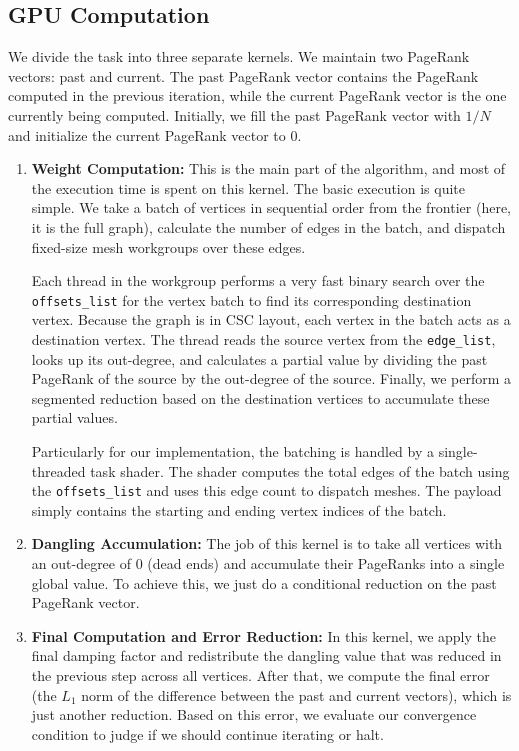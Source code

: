 \documentclass[11pt, a4paper]{article}
\begin{document}
\subsection{GPU Computation}
We divide the task into three separate kernels. We maintain two PageRank vectors: past and current. The past PageRank vector contains the PageRank computed in the previous iteration, while the current PageRank vector is the one currently being computed. Initially, we fill the past PageRank vector with $1/N$ and initialize the current PageRank vector to $0$.

\begin{enumerate}
    \item \textbf{Weight Computation:} 
    This is the main part of the algorithm, and most of the execution time is spent on this kernel. The basic execution is quite simple. We take a batch of vertices in sequential order from the frontier (here, it is the full graph), calculate the number of edges in the batch, and dispatch fixed-size mesh workgroups over these edges. 
    
    Each thread in the workgroup performs a very fast binary search over the \texttt{offsets\_list} for the vertex batch to find its corresponding destination vertex. Because the graph is in CSC layout, each vertex in the batch acts as a destination vertex. The thread reads the source vertex from the \texttt{edge\_list}, looks up its out-degree, and calculates a partial value by dividing the past PageRank of the source by the out-degree of the source. Finally, we perform a segmented reduction based on the destination vertices to accumulate these partial values.
    
    Particularly for our implementation, the batching is handled by a single-threaded task shader. The shader computes the total edges of the batch using the \texttt{offsets\_list} and uses this edge count to dispatch meshes. The payload simply contains the starting and ending vertex indices of the batch.

    \item \textbf{Dangling Accumulation:} 
    The job of this kernel is to take all vertices with an out-degree of $0$ (dead ends) and accumulate their PageRanks into a single global value. To achieve this, we just do a conditional reduction on the past PageRank vector.

    \item \textbf{Final Computation and Error Reduction:} 
    In this kernel, we apply the final damping factor and redistribute the dangling value that was reduced in the previous step across all vertices. After that, we compute the final error (the $L_1$ norm of the difference between the past and current vectors), which is just another reduction. Based on this error, we evaluate our convergence condition to judge if we should continue iterating or halt.
\end{enumerate}
\end{document}
